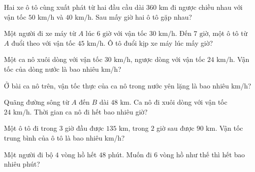\begin{ex}
  Hai xe ô tô cùng xuất phát từ hai đầu cầu dài $360\text{ km}$ đi ngược chiều nhau với vận tốc $50\text{ km/h}$ và $40\text{ km/h}$. Sau mấy giờ hai ô tô gặp nhau?
\end{ex}

\begin{ex}
  Một người đi xe máy từ $A$ lúc $6\text{ giờ}$ với vận tốc $30\text{ km/h}$. Đến $7\text{ giờ}$, một ô tô từ $A$ đuổi theo với vận tốc $45\text{ km/h}$. Ô tô đuổi kịp xe máy lúc mấy giờ?
\end{ex}

\begin{ex}
  Một ca nô xuôi dòng với vận tốc $30\text{ km/h}$, ngược dòng với vận tốc $24\text{ km/h}$. Vận tốc của dòng nước là bao nhiêu km/h?
\end{ex}

\begin{ex}
  Ở bài ca nô trên, vận tốc thực của ca nô trong nước yên lặng là bao nhiêu km/h?
\end{ex}

\begin{ex}
  Quãng đường sông từ $A$ đến $B$ dài $48\text{ km}$. Ca nô đi xuôi dòng với vận tốc $24\text{ km/h}$. Thời gian ca nô đi hết bao nhiêu giờ?
\end{ex}

\begin{ex}
  Một ô tô đi trong $3$ giờ đầu được $135\text{ km}$, trong $2$ giờ sau được $90\text{ km}$. Vận tốc trung bình của ô tô là bao nhiêu km/h?
\end{ex}

\begin{ex}
  Một người đi bộ $4$ vòng hồ hết $48$ phút. Muốn đi $6$ vòng hồ như thế thì hết bao nhiêu phút?
\end{ex}

